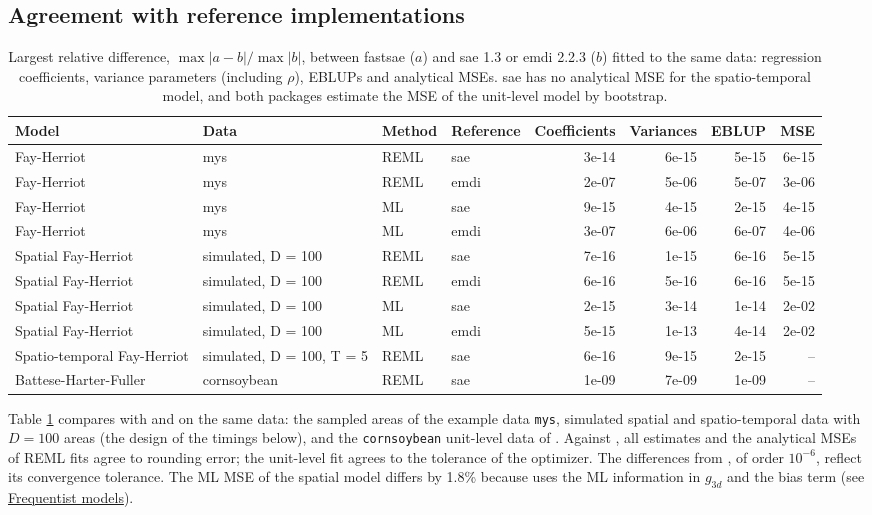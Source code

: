 \subsection{Agreement with reference implementations}\label{sec:agreement}

\begin{table}[!h]
\centering
\caption{\label{tab:agreement}Largest relative difference, $\max|a - b| / \max|b|$, between fastsae ($a$) and sae 1.3 or emdi 2.2.3 ($b$) fitted to the same data: regression coefficients, variance parameters (including $\rho$), EBLUPs and analytical MSEs. sae has no analytical MSE for the spatio-temporal model, and both packages estimate the MSE of the unit-level model by bootstrap.}
\centering
\fontsize{8}{10}\selectfont
\begin{tabular}[t]{llllrrrr}
\toprule
Model & Data & Method & Reference & Coefficients & Variances & EBLUP & MSE\\
\midrule
Fay-Herriot & mys & REML & sae & 3e-14 & 6e-15 & 5e-15 & 6e-15\\
Fay-Herriot & mys & REML & emdi & 2e-07 & 5e-06 & 5e-07 & 3e-06\\
Fay-Herriot & mys & ML & sae & 9e-15 & 4e-15 & 2e-15 & 4e-15\\
Fay-Herriot & mys & ML & emdi & 3e-07 & 6e-06 & 6e-07 & 4e-06\\
Spatial Fay-Herriot & simulated, D = 100 & REML & sae & 7e-16 & 1e-15 & 6e-16 & 5e-15\\
Spatial Fay-Herriot & simulated, D = 100 & REML & emdi & 6e-16 & 5e-16 & 6e-16 & 5e-15\\
Spatial Fay-Herriot & simulated, D = 100 & ML & sae & 2e-15 & 3e-14 & 1e-14 & 2e-02\\
Spatial Fay-Herriot & simulated, D = 100 & ML & emdi & 5e-15 & 1e-13 & 4e-14 & 2e-02\\
Spatio-temporal Fay-Herriot & simulated, D = 100, T = 5 & REML & sae & 6e-16 & 9e-15 & 2e-15 & --\\
Battese-Harter-Fuller & cornsoybean & REML & sae & 1e-09 & 7e-09 & 1e-09 & --\\
\bottomrule
\end{tabular}
\end{table}

Table \ref{tab:agreement} compares  with  and  on the same data: the sampled areas of the example data \texttt{mys}, simulated spatial and spatio-temporal data with \(D = 100\) areas (the design of the timings below), and the \texttt{cornsoybean} unit-level data of \citet{battese1988error}. Against , all estimates and the analytical MSEs of REML fits agree to rounding error; the unit-level fit agrees to the tolerance of the optimizer. The differences from , of order \(10^{-6}\), reflect its convergence tolerance. The ML MSE of the spatial model differs by 1.8\% because  uses the ML information in \(g_{3d}\) and the bias term (see \hyperref[sec:methods-freq]{Frequentist models}).

